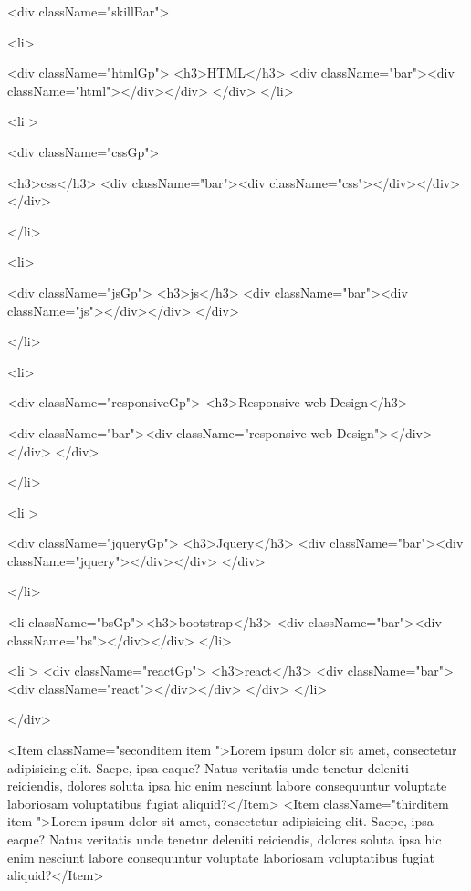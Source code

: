 <div className="skillBar">


<li>

  
  <div className="htmlGp">
  <h3>HTML</h3>
<div className="bar"><div className="html"></div></div>
  </div>
</li>


<li >


 <div className="cssGp">

 <h3>css</h3>
<div className="bar"><div className="css"></div></div>
 </div>
 
</li>



<li>
  
  
<div className="jsGp">
<h3>js</h3>
<div className="bar"><div className="js"></div></div>
</div>

</li>


<li>

  
<div className="responsiveGp">
<h3>Responsive web Design</h3>
 
 <div className="bar"><div className="responsive web Design"></div></div>
</div>


</li>


<li >

 
<div className="jqueryGp">
<h3>Jquery</h3>
<div className="bar"><div className="jquery"></div></div>
</div>

</li>




<li className="bsGp"><h3>bootstrap</h3>
<div className="bar"><div className="bs"></div></div>
</li>





<li >
 <div className="reactGp">
 <h3>react</h3>
<div className="bar"><div className="react"></div></div>
</div>
</li>





</div>










  <Item className="seconditem  item  ">Lorem ipsum dolor sit amet, consectetur adipisicing elit. Saepe, ipsa eaque? Natus veritatis unde tenetur deleniti reiciendis, dolores soluta ipsa hic enim nesciunt labore consequuntur voluptate laboriosam voluptatibus fugiat aliquid?</Item>
      <Item className="thirditem  item ">Lorem ipsum dolor sit amet, consectetur adipisicing elit. Saepe, ipsa eaque? Natus veritatis unde tenetur deleniti reiciendis, dolores soluta ipsa hic enim nesciunt labore consequuntur voluptate laboriosam voluptatibus fugiat aliquid?</Item>

